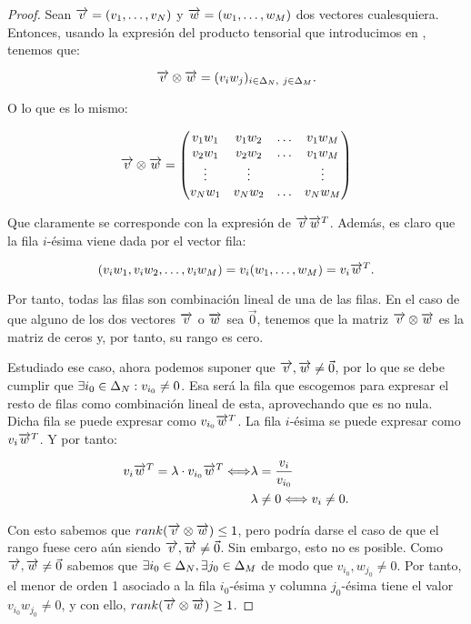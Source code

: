 \begin{proof}

	Sean $\overrightarrow{v} = (v_1, \ldots, v_N)$ y $\overrightarrow{w} = (w_1, \ldots, w_M)$ dos vectores cualesquiera. Entonces, usando la expresión del producto tensorial que introducimos en , tenemos que:

	\begin{equation}
		\overrightarrow{v} \otimes \overrightarrow{w} = (v_i w_j)_{i \in \Delta_{N},\ j \in \Delta_{M}}.
	\end{equation}

	O lo que es lo mismo:

	\begin{equation}
		\overrightarrow{v} \otimes \overrightarrow{w} = \begin{pmatrix}
			v_1 w_1 & v_1 w_2 & \ldots & v_1 w_M \\
			v_2 w_1 & v_2 w_2 & \ldots & v_1 w_M \\
			\vdots  & \vdots  &        & \vdots  \\
			v_N w_1 & v_N w_2 & \ldots & v_N w_M \\
		\end{pmatrix}
	\end{equation}

	Que claramente se corresponde con la expresión de $\overrightarrow{v} \overrightarrow{w}^T$. Además, es claro que la fila $i$-ésima viene dada por el vector fila:

	$$(v_i w_1, v_i w_2, \ldots, v_i w_M) = v_i (w_1, \ldots, w_M) = v_i \overrightarrow{w}^T.$$

	Por tanto, todas las filas son combinación lineal de una de las filas. En el caso de que alguno de los dos vectores $\overrightarrow{v}$ o $\overrightarrow{w}$ sea $\vec{0}$, tenemos que la matriz $\overrightarrow{v} \otimes \overrightarrow{w}$ es la matriz de ceros y, por tanto, su rango es cero.

	Estudiado ese caso, ahora podemos suponer que $\overrightarrow{v}, \overrightarrow{w} \neq \vec{0}$, por lo que se debe cumplir que $\exists i_0 \in \Delta_{N}: v_{i_0} \neq 0$. Esa será la fila que escogemos para expresar el resto de filas como combinación lineal de esta, aprovechando que es no nula. Dicha fila se puede expresar como $v_{i_0} \overrightarrow{w}^T$. La fila $i$-ésima se puede expresar como $v_i \overrightarrow{w}^T$. Y por tanto:

	\begin{equation}
		\begin{split}
			v_i \overrightarrow{w}^T = \lambda \cdot v_{i_0} \overrightarrow{w}^T \Longleftrightarrow & \lambda = \frac{v_i}{v_{i_0}} \\
			& \lambda \neq 0 \Longleftrightarrow v_i \neq 0.
		\end{split}
	\end{equation}

	Con esto sabemos que $rank(\overrightarrow{v} \otimes \overrightarrow{w}) \leq 1$, pero podría darse el caso de que el rango fuese cero aún siendo $\overrightarrow{v}, \overrightarrow{w} \neq \vec{0}$. Sin embargo, esto no es posible. Como $\overrightarrow{v}, \overrightarrow{w} \neq \vec{0}$ sabemos que  $\exists i_0 \in \Delta_{N}, \exists j_0 \in \Delta_{M}$ de modo que $v_{i_0}, w_{j_0} \neq 0$. Por tanto, el menor de orden 1 asociado a la fila $i_0$-ésima y columna $j_0$-ésima tiene el valor $v_{i_0} w_{j_0} \neq 0$, y con ello, $rank(\overrightarrow{v} \otimes \overrightarrow{w}) \geq 1$.

\end{proof}

